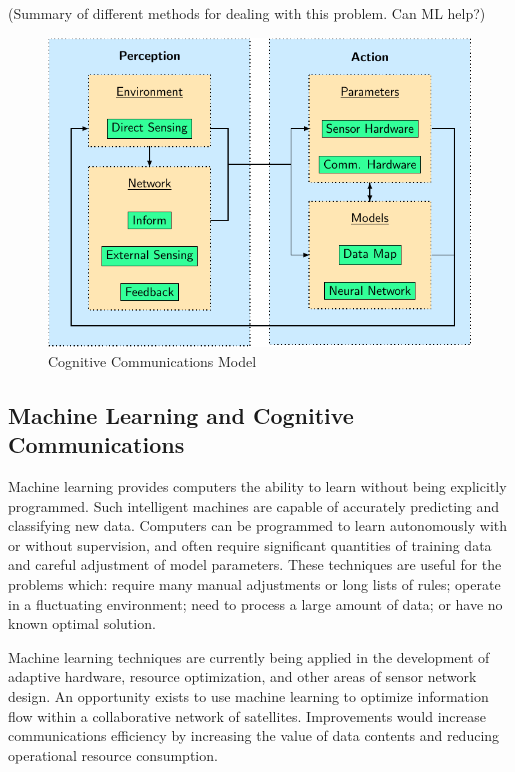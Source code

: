 \documentclass[conference]{IEEEtran}
\begin{document}
{\color{red} (Summary of different methods for dealing with this problem. Can ML help?)}

\begin{figure}[b]
  \centerline{\includegraphics[width=0.9\linewidth]{images/working/flowchart.pdf}}
  \caption{Cognitive Communications Model}
  \label{fig:model}
\end{figure}

\subsection{Machine Learning and Cognitive Communications}
\label{ssec:ml}

Machine learning provides computers the ability to learn without being explicitly programmed.  Such intelligent machines are capable of accurately predicting and classifying new data.  Computers can be programmed to learn autonomously with or without supervision, and often require significant quantities of training data and careful adjustment of model parameters.  These techniques are useful for the problems which: require many manual adjustments or long lists of rules; operate in a fluctuating environment; need to process a large amount of data; or have no known optimal solution.

Machine learning techniques are currently being applied in the development of adaptive hardware, resource optimization, and other areas of sensor network design.  An opportunity exists to use machine learning to optimize information flow within a collaborative network of satellites.  Improvements would increase communications efficiency by increasing the value of data contents and reducing operational resource consumption.
\end{document}
